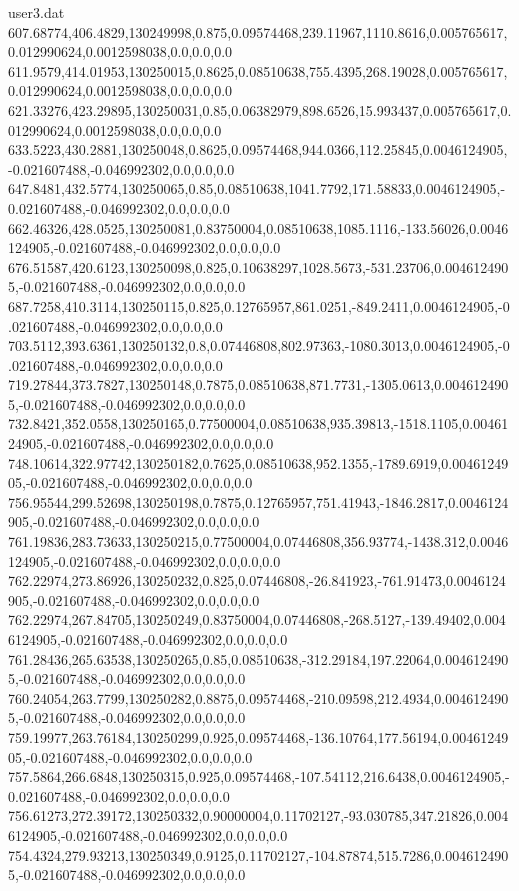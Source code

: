 \begin{filecontents}{user3.dat}
607.68774,406.4829,130249998,0.875,0.09574468,239.11967,1110.8616,0.005765617,0.012990624,0.0012598038,0.0,0.0,0.0
611.9579,414.01953,130250015,0.8625,0.08510638,755.4395,268.19028,0.005765617,0.012990624,0.0012598038,0.0,0.0,0.0
621.33276,423.29895,130250031,0.85,0.06382979,898.6526,15.993437,0.005765617,0.012990624,0.0012598038,0.0,0.0,0.0
633.5223,430.2881,130250048,0.8625,0.09574468,944.0366,112.25845,0.0046124905,-0.021607488,-0.046992302,0.0,0.0,0.0
647.8481,432.5774,130250065,0.85,0.08510638,1041.7792,171.58833,0.0046124905,-0.021607488,-0.046992302,0.0,0.0,0.0
662.46326,428.0525,130250081,0.83750004,0.08510638,1085.1116,-133.56026,0.0046124905,-0.021607488,-0.046992302,0.0,0.0,0.0
676.51587,420.6123,130250098,0.825,0.10638297,1028.5673,-531.23706,0.0046124905,-0.021607488,-0.046992302,0.0,0.0,0.0
687.7258,410.3114,130250115,0.825,0.12765957,861.0251,-849.2411,0.0046124905,-0.021607488,-0.046992302,0.0,0.0,0.0
703.5112,393.6361,130250132,0.8,0.07446808,802.97363,-1080.3013,0.0046124905,-0.021607488,-0.046992302,0.0,0.0,0.0
719.27844,373.7827,130250148,0.7875,0.08510638,871.7731,-1305.0613,0.0046124905,-0.021607488,-0.046992302,0.0,0.0,0.0
732.8421,352.0558,130250165,0.77500004,0.08510638,935.39813,-1518.1105,0.0046124905,-0.021607488,-0.046992302,0.0,0.0,0.0
748.10614,322.97742,130250182,0.7625,0.08510638,952.1355,-1789.6919,0.0046124905,-0.021607488,-0.046992302,0.0,0.0,0.0
756.95544,299.52698,130250198,0.7875,0.12765957,751.41943,-1846.2817,0.0046124905,-0.021607488,-0.046992302,0.0,0.0,0.0
761.19836,283.73633,130250215,0.77500004,0.07446808,356.93774,-1438.312,0.0046124905,-0.021607488,-0.046992302,0.0,0.0,0.0
762.22974,273.86926,130250232,0.825,0.07446808,-26.841923,-761.91473,0.0046124905,-0.021607488,-0.046992302,0.0,0.0,0.0
762.22974,267.84705,130250249,0.83750004,0.07446808,-268.5127,-139.49402,0.0046124905,-0.021607488,-0.046992302,0.0,0.0,0.0
761.28436,265.63538,130250265,0.85,0.08510638,-312.29184,197.22064,0.0046124905,-0.021607488,-0.046992302,0.0,0.0,0.0
760.24054,263.7799,130250282,0.8875,0.09574468,-210.09598,212.4934,0.0046124905,-0.021607488,-0.046992302,0.0,0.0,0.0
759.19977,263.76184,130250299,0.925,0.09574468,-136.10764,177.56194,0.0046124905,-0.021607488,-0.046992302,0.0,0.0,0.0
757.5864,266.6848,130250315,0.925,0.09574468,-107.54112,216.6438,0.0046124905,-0.021607488,-0.046992302,0.0,0.0,0.0
756.61273,272.39172,130250332,0.90000004,0.11702127,-93.030785,347.21826,0.0046124905,-0.021607488,-0.046992302,0.0,0.0,0.0
754.4324,279.93213,130250349,0.9125,0.11702127,-104.87874,515.7286,0.0046124905,-0.021607488,-0.046992302,0.0,0.0,0.0

\end{filecontents}
